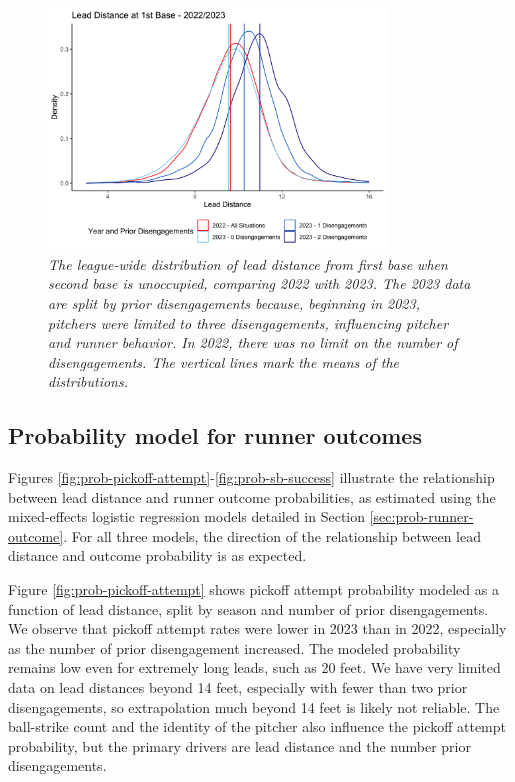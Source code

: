 \documentclass{article}
\begin{document}
      \begin{figure}
        \centering
        \includegraphics[width = 0.8\textwidth]{../../output/figures/leads_overall.png}
        \caption{
          \it The league-wide distribution of lead distance from first base when second base is unoccupied, comparing 2022 with 2023. The 2023 data are split by prior disengagements because, beginning in 2023, pitchers were limited to three disengagements, influencing pitcher and runner behavior. In 2022, there was no limit on the number of disengagements. The vertical lines mark the means of the distributions.
        }
        \label{fig:leads-overall}
      \end{figure}
      
    \subsection{Probability model for runner outcomes}

      Figures \ref{fig:prob-pickoff-attempt}-\ref{fig:prob-sb-success} illustrate the relationship between lead distance and runner outcome probabilities, as estimated using the mixed-effects logistic regression models detailed in Section \ref{sec:prob-runner-outcome}. For all three models, the direction of the relationship between lead distance and outcome probability is as expected.

      Figure \ref{fig:prob-pickoff-attempt} shows pickoff attempt probability modeled as a function of lead distance, split by season and number of prior disengagements. We observe that pickoff attempt rates were lower in 2023 than in 2022, especially as the number of prior disengagement increased. The modeled probability remains low even for extremely long leads, such as 20 feet. We have very limited data on lead distances beyond 14 feet, especially with fewer than two prior disengagements, so extrapolation much beyond 14 feet is likely not reliable. The ball-strike count and the identity of the pitcher also influence the pickoff attempt probability, but the primary drivers are lead distance and the number prior disengagements.
      
\end{document}
